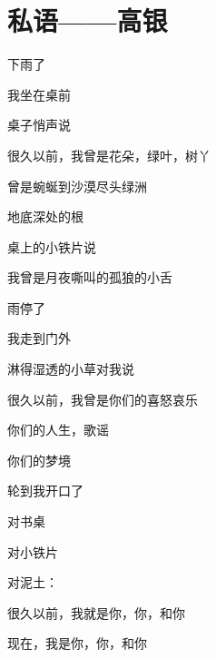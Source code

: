 \section{私语——高银}
下雨了

我坐在桌前

桌子悄声说

很久以前，我曾是花朵，绿叶，树丫

曾是蜿蜒到沙漠尽头绿洲

地底深处的根

桌上的小铁片说

我曾是月夜嘶叫的孤狼的小舌

雨停了

我走到门外

淋得湿透的小草对我说

很久以前，我曾是你们的喜怒哀乐

你们的人生，歌谣

你们的梦境

轮到我开口了

对书桌

对小铁片

对泥土：

很久以前，我就是你，你，和你

现在，我是你，你，和你
